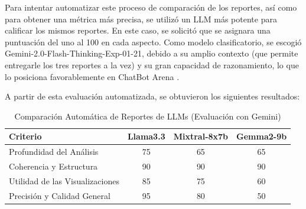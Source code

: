 Para intentar automatizar este proceso de comparación de los reportes, así como para obtener una métrica más precisa, se utilizó un LLM más potente para calificar los mismos reportes. En este caso, se solicitó que se asignara una puntuación del uno al 100 en cada aspecto. Como modelo clasificatorio, se escogió Gemini-2.0-Flash-Thinking-Exp-01-21, debido a su amplio contexto (que permite entregarle los tres reportes a la vez) y su gran capacidad de razonamiento, lo que lo posiciona favorablemente en ChatBot Arena \cite{chiang2024chatbot}.

A partir de esta evaluación automatizada, se obtuvieron los siguientes resultados:

\begin{table}[htbp]
	\centering
	\caption{Comparación Automática de Reportes de LLMs (Evaluación con Gemini)}
	\label{tab:comparacion_reportes_gemini}
	\begin{tabular}{@{}lccc@{}}
		\toprule
		Criterio & Llama3.3 & Mixtral-8x7b & Gemma2-9b \\
		\midrule
		Profundidad del Análisis & 75 & 65 & 65 \\
		Coherencia y Estructura & 90 & 90 & 90 \\
		Utilidad de las Visualizaciones & 85 & 75 & 60 \\
		Precisión y Calidad General & 95 & 80 & 50 \\
		\bottomrule
	\end{tabular}
\end{table}
